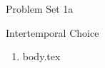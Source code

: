 \documentclass{handout}
\begin{document}
\centerline{\Large Problem Set 1a}
\centerline{\large Intertemporal Choice}

\begin{enumerate}

\item {body.tex}



\end{enumerate}


\end{document}
